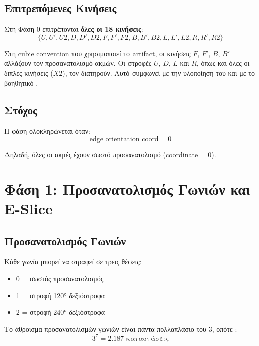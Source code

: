 \subsection{Επιτρεπόμενες Κινήσεις}

Στη Φάση 0 επιτρέπονται \textbf{όλες οι 18 κινήσεις}:
\begin{equation}
    \{U, U', U2, D, D', D2, F, F', F2, B, B', B2, L, L', L2, R, R', R2\}
\end{equation}

Στη cubie convention που χρησιμοποιεί το artifact, οι κινήσεις $F$, $F'$,
$B$, $B'$ αλλάζουν τον προσανατολισμό ακμών. Οι στροφές $U$, $D$, $L$ και
$R$, όπως και όλες οι διπλές κινήσεις ($X2$), τον διατηρούν. Αυτό συμφωνεί
με την υλοποίηση του  και με το βοηθητικό
.

\subsection{Στόχος}

Η φάση ολοκληρώνεται όταν:
\begin{equation}
    \text{edge\_orientation\_coord} = 0
\end{equation}

Δηλαδή, όλες οι ακμές έχουν σωστό προσανατολισμό (coordinate = 0).


\section{Φάση 1: Προσανατολισμός Γωνιών και E-Slice}
\label{sec:phase1}

\subsection{Προσανατολισμός Γωνιών}

Κάθε γωνία μπορεί να στραφεί σε τρεις θέσεις:
\begin{itemize}
    \item 0 = σωστός προσανατολισμός
    \item 1 = στροφή 120° δεξιόστροφα
    \item 2 = στροφή 240° δεξιόστροφα
\end{itemize}

Το άθροισμα προσανατολισμών γωνιών είναι πάντα πολλαπλάσιο του 3, οπότε \cite{scherphuis_thistlethwaite_summary}:
\begin{equation}
    3^7 = 2.187 \text{ καταστάσεις}
\end{equation}

